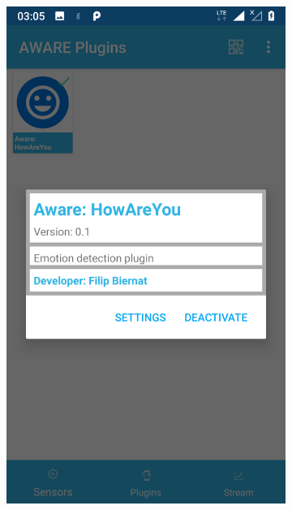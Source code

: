 \begin{itemize}
	\begin{figure}[H]
		\centering
		\begin{subfigure}{0.35\textwidth}
			\centering
			\includegraphics[scale=0.13]{rozdzial3/Ustawienia_uruchomienie.png}
			\subcaption{\label{subfigure_a}}
		\end{subfigure}
		\begin{subfigure}{0.35\textwidth}
			\centering

\end{subfigure}
\end{figure}
\end{itemize}
